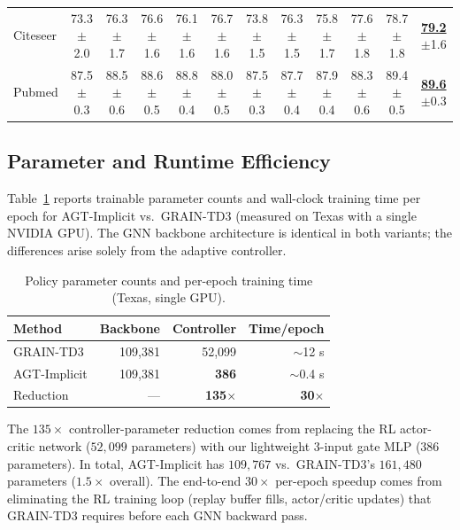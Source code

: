 \documentclass[letterpaper]{article}
\begin{document}
\begin{table}[t]
{\begin{tabular}{lccccccccccc}
    Citeseer & 73.3{\tiny$\pm$2.0} & 76.3{\tiny$\pm$1.7} & 76.6{\tiny$\pm$1.6} & 76.1{\tiny$\pm$1.6} & 76.7{\tiny$\pm$1.6} & 73.8{\tiny$\pm$1.5} & 76.3{\tiny$\pm$1.5} & 75.8{\tiny$\pm$1.7} & 77.6{\tiny$\pm$1.8} & 78.7{\tiny$\pm$1.8} & \underline{\textbf{79.2}}{\tiny$\pm$1.6} \\
    Pubmed & 87.5{\tiny$\pm$0.3} & 88.5{\tiny$\pm$0.6} & 88.6{\tiny$\pm$0.5} & 88.8{\tiny$\pm$0.4} & 88.0{\tiny$\pm$0.5} & 87.5{\tiny$\pm$0.3} & 87.7{\tiny$\pm$0.4} & 87.9{\tiny$\pm$0.4} & 88.3{\tiny$\pm$0.6} & 89.4{\tiny$\pm$0.5} & \underline{\textbf{89.6}}{\tiny$\pm$0.3} \\
    \bottomrule
  \end{tabular}}
\end{table}

\subsection{Parameter and Runtime Efficiency}
\label{sec:params}
Table~\ref{tab:params} reports trainable parameter counts and wall-clock training time per epoch for AGT-Implicit vs.\ GRAIN-TD3 (measured on Texas with a single NVIDIA GPU). The GNN backbone architecture is identical in both variants; the differences arise solely from the adaptive controller.

\begin{table}[h]
  \centering
  \caption{Policy parameter counts and per-epoch training time (Texas, single GPU).}
  \label{tab:params}
  \footnotesize
  \begin{tabular}{lrrr}
    \toprule
    Method & Backbone & Controller & Time/epoch \\
    \midrule
    GRAIN-TD3       & 109{,}381 & 52{,}099  & $\sim$12 s \\
    AGT-Implicit    & 109{,}381 & \textbf{386} & $\sim$0.4 s \\
    \midrule
    Reduction       & — & \textbf{135$\times$} & \textbf{30$\times$} \\
    \bottomrule
  \end{tabular}
\end{table}

The $135\times$ controller-parameter reduction comes from replacing the RL actor-critic network ($52{,}099$ parameters) with our lightweight 3-input gate MLP ($386$ parameters). In total, AGT-Implicit has $109{,}767$ vs.\ GRAIN-TD3's $161{,}480$ parameters ($1.5\times$ overall). The end-to-end $30\times$ per-epoch speedup comes from eliminating the RL training loop (replay buffer fills, actor/critic updates) that GRAIN-TD3 requires before each GNN backward pass.
\end{document}
